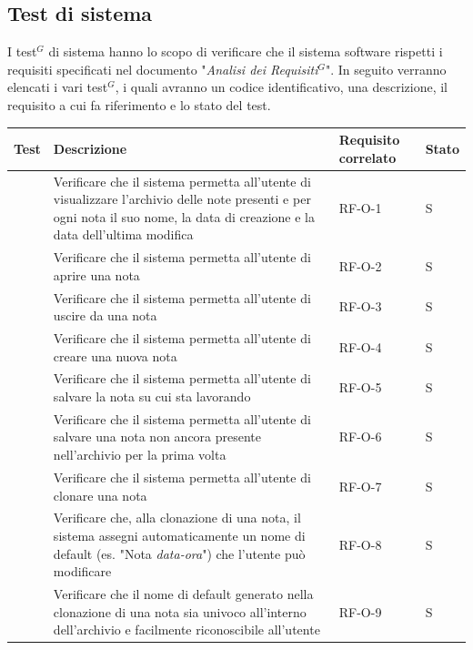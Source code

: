 \documentclass[a4paper,10pt]{article}
\begin{document}
\subsection{Test di sistema}
I test$^G$ di sistema hanno lo scopo di verificare che il sistema software rispetti i requisiti specificati nel documento "\textit{Analisi dei Requisiti$^G$}". In seguito verranno elencati i vari test$^G$, i quali avranno un codice identificativo, una descrizione, il requisito a cui fa riferimento e lo stato del test. \\


\newcommand{\testS}{%
    \stepcounter{TS@}%
    \noindent{TS-\arabic{TS@}}\quad\par
}

\begin{longtable}{|l|p{8cm}|p{2cm}|p{1.5cm}|}
    \hline
    \textbf{Test} & \textbf{Descrizione} & \textbf{Requisito correlato} & \textbf{Stato} \\ \hline
    \endfirsthead
    \hline
    \testS & Verificare che il sistema permetta all'utente di visualizzare l'archivio delle note presenti e per ogni nota il suo nome, la data di creazione e la data dell'ultima modifica & RF-O-1 & S \\ \hline
    \testS & Verificare che il sistema permetta all'utente di aprire una nota & RF-O-2 & S \\ \hline
    \testS & Verificare che il sistema permetta all'utente di uscire da una nota & RF-O-3 & S \\ \hline
    \testS & Verificare che il sistema permetta all'utente di creare una nuova nota & RF-O-4 & S \\ \hline
    \testS & Verificare che il sistema permetta all'utente di salvare la nota su cui sta lavorando & RF-O-5 & S \\ \hline
    \testS & Verificare che il sistema permetta all'utente di salvare una nota non ancora presente nell'archivio per la prima volta & RF-O-6 & S \\ \hline
    \testS & Verificare che il sistema permetta all'utente di clonare una nota & RF-O-7 & S \\ \hline
    \testS & Verificare che, alla clonazione di una nota, il sistema assegni automaticamente un nome di default (es. "Nota \textit{data-ora}") che l’utente può modificare & RF-O-8 & S \\ \hline
    \testS & Verificare che il nome di default generato nella clonazione di una nota sia univoco all'interno dell'archivio e facilmente riconoscibile all'utente & RF-O-9 & S \\ \hline

\end{longtable}
\end{document}
